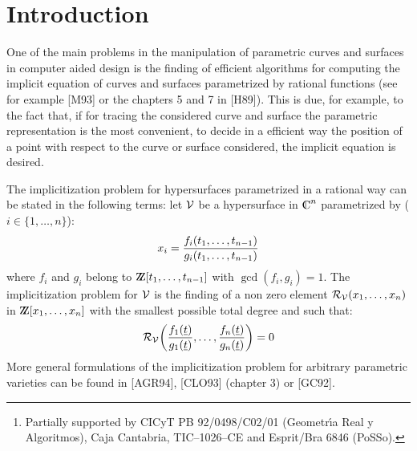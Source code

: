 \author{L. Gonz\'alez-Vega\thanks{Partially supported by CICyT PB
92/0498/C02/01 (Geometr\'{\i}a Real y  Algoritmos), Caja Cantabria,
TIC--1026--CE and Esprit/Bra  6846 (PoSSo).}\\ 
Dpto. Matem\'aticas, Estad\'{\i}stica y Computaci\'on\\ Universidad de 
Cantabria, Santander 39071, Spain}

\date{ }


\maketitle

\begin{abstract} {\eirm This paper is devoted to present a new algorithm 
computing the implicit  equation of a parametric plane curve and several
classes of parametric surfaces in the three dimensional euclidean
space. This algorithm does not require of the computation of any
symbolic determinant or Grobner Basis, being these tools replaced by
the computation of some symmetric functions, in particular the Newton
Sums on the solution set of a well precised zero dimensional ideal.}
\end{abstract}

\section{Introduction}

One of the main problems in the manipulation of parametric curves and
surfaces in computer aided design is the finding of efficient
algorithms for computing the implicit equation of curves and surfaces
parametrized by rational functions (see for example [M93] or the
chapters 5 and 7 in [H89]). This is due, for example, to the fact
that, if for tracing the considered curve and surface the parametric
representation is the most convenient, to decide in a efficient way
the position of a point with respect to the curve or surface considered,
the implicit equation is desired.

The implicitization problem for hypersurfaces parametrized in a
rational way can be stated in the following terms: let  ${\cal V}$ be
a hypersurface in 
$\C^{n}$ parametrized by ($i\in \{1,\ldots,n\}$):
\[x_i={{f_i(t_1,\ldots,t_{n-1})}\over{g_i(t_1,\ldots,t_{n-1})}}\]
where
$f_i$ and $g_i$ belong to $\Z[t_1,\ldots,t_{n-1}]$ with
$\gcd(f_i,g_i)=1$. The implicitization problem for ${\cal V}$ is the
finding of a non zero element
${\cal R}_{\cal V}(x_1,\ldots,x_n)$ in $\Z[x_1,\ldots,x_n]$ with the
smallest possible total degree and such that:
\[{\cal R}_{\cal V}\bigg(
        {{f_1(\underline{t})}\over{g_1(\underline{t})}},\ldots,
        {{f_n(\underline{t})}\over{g_n(\underline{t})}}\bigg)=0\] 
More general formulations of the implicitization problem for
arbitrary parametric varieties can be found in [AGR94], [CLO93]
(chapter 3) or [GC92].

